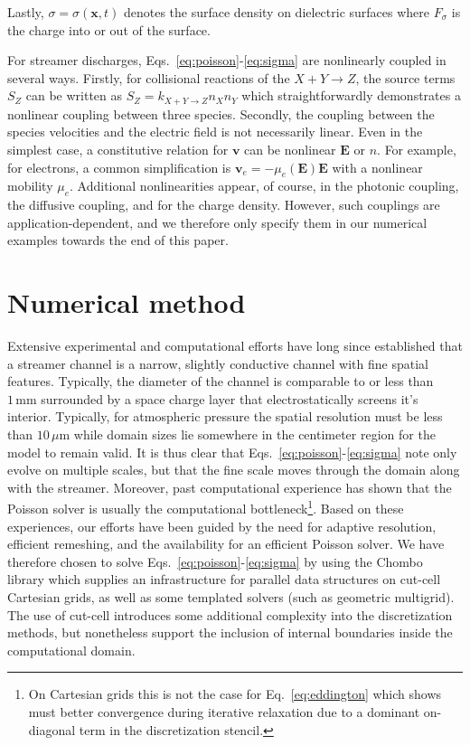 \documentclass[3p]{elsarticle}
\begin{document}
Lastly, $\sigma = \sigma(\bm{x}, t)$ denotes the surface density on dielectric surfaces where $F_\sigma$ is the charge into or out of the surface. 

For streamer discharges, Eqs.~\eqref{eq:poisson}-\eqref{eq:sigma} are nonlinearly coupled in several ways. Firstly, for collisional reactions of the $X + Y \rightarrow Z$, the source terms $S_Z$ can be written as $S_Z = k_{X+Y\rightarrow Z}n_Xn_Y$ which straightforwardly demonstrates a nonlinear coupling between three species. Secondly, the coupling between the species velocities and the electric field is not necessarily linear. Even in the simplest case, a constitutive relation for $\bm{v}$ can be nonlinear $\bm{E}$ or $n$. For example, for electrons, a common simplification is $\bm{v}_e = -\mu_e(\bm{E})\bm{E}$ with a nonlinear mobility $\mu_e$. Additional nonlinearities appear, of course, in the photonic coupling, the diffusive coupling, and for the charge density. However, such couplings are application-dependent, and we therefore only specify them in our numerical examples towards the end of this paper. 

\section{Numerical method}
\label{sec:method}
Extensive experimental and computational efforts have long since established that a streamer channel is a narrow, slightly conductive channel with fine spatial features. Typically, the diameter of the channel is comparable to or less than $1\,\text{mm}$ surrounded by a space charge layer that electrostatically screens it's interior. Typically, for atmospheric pressure the spatial resolution must be less than $10\,\mu\text{m}$ while domain sizes lie somewhere in the centimeter region for the model to remain valid. It is thus clear that Eqs.~\eqref{eq:poisson}-\eqref{eq:sigma} note only evolve on multiple scales, but that the fine scale moves through the domain along with the streamer. Moreover, past computational experience has shown that the Poisson solver is usually the computational bottleneck\footnote{On Cartesian grids this is not the case for Eq.~\eqref{eq:eddington} which shows must better convergence during iterative relaxation due to a dominant on-diagonal term in the discretization stencil.}. Based on these experiences, our efforts have been guided by the need for adaptive resolution, efficient remeshing, and the availability for an efficient Poisson solver. We have therefore chosen to solve Eqs.~\ref{eq:poisson}-\ref{eq:sigma} by using the Chombo library which supplies an infrastructure for parallel data structures on cut-cell Cartesian grids, as well as some templated solvers (such as geometric multigrid). The use of cut-cell introduces some additional complexity into the discretization methods, but nonetheless support the inclusion of internal boundaries inside the computational domain.
\end{document}
